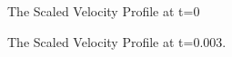 \documentclass{article}
\begin{document}
  \begin{figure}[H]
    \centering
    \noindent{}
    \caption{The Scaled Velocity Profile at t=0} \label{fig:00}
  \end{figure}
  
  \begin{figure}[H]
    \centering
    \noindent{}
    \caption{The Scaled Velocity Profile at t=0.003.} \label{fig:11}
  \end{figure}
  
\end{document}
